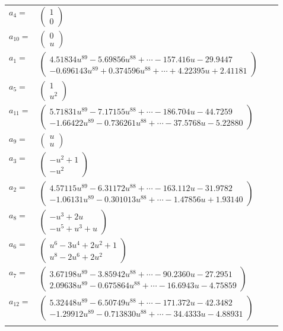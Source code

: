 \documentclass[1p]{elsarticle_modified}
\theoremstyle{definition}
\begin{document}
\begin{tabular}{m{7pt} m{180pt} m{7pt} m{180pt} }
\flushright $a_{4}=$&$\begin{pmatrix}1\\0\end{pmatrix}$ \\
\flushright $a_{10}=$&$\begin{pmatrix}0\\u\end{pmatrix}$ \\
\flushright $a_{1}=$&$\begin{pmatrix}4.51834 u^{89}-5.69856 u^{88}+\cdots-157.416 u-29.9447\\-0.696143 u^{89}+0.374596 u^{88}+\cdots+4.22395 u+2.41181\end{pmatrix}$ \\
\flushright $a_{5}=$&$\begin{pmatrix}1\\u^2\end{pmatrix}$ \\
\flushright $a_{11}=$&$\begin{pmatrix}5.71831 u^{89}-7.17155 u^{88}+\cdots-186.704 u-44.7259\\-1.66422 u^{89}-0.736261 u^{88}+\cdots-37.5768 u-5.22880\end{pmatrix}$ \\
\flushright $a_{9}=$&$\begin{pmatrix}u\\u\end{pmatrix}$ \\
\flushright $a_{3}=$&$\begin{pmatrix}- u^2+1\\- u^2\end{pmatrix}$ \\
\flushright $a_{2}=$&$\begin{pmatrix}4.57115 u^{89}-6.31172 u^{88}+\cdots-163.112 u-31.9782\\-1.06131 u^{89}-0.301013 u^{88}+\cdots-1.47856 u+1.93140\end{pmatrix}$ \\
\flushright $a_{8}=$&$\begin{pmatrix}- u^3+2 u\\- u^5+u^3+u\end{pmatrix}$ \\
\flushright $a_{6}=$&$\begin{pmatrix}u^6-3 u^4+2 u^2+1\\u^8-2 u^6+2 u^2\end{pmatrix}$ \\
\flushright $a_{7}=$&$\begin{pmatrix}3.67198 u^{89}-3.85942 u^{88}+\cdots-90.2360 u-27.2951\\2.09638 u^{89}-0.675864 u^{88}+\cdots-16.6943 u-4.75859\end{pmatrix}$ \\
\flushright $a_{12}=$&$\begin{pmatrix}5.32448 u^{89}-6.50749 u^{88}+\cdots-171.372 u-42.3482\\-1.29912 u^{89}-0.713830 u^{88}+\cdots-34.4333 u-4.88931\end{pmatrix}$\\&\end{tabular}
\end{document}

